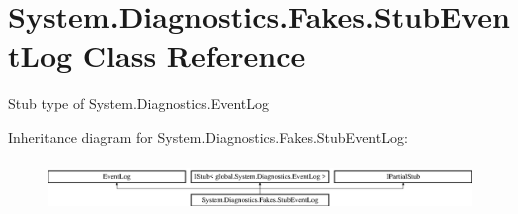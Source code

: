 \hypertarget{class_system_1_1_diagnostics_1_1_fakes_1_1_stub_event_log}{\section{System.\-Diagnostics.\-Fakes.\-Stub\-Event\-Log Class Reference}
\label{class_system_1_1_diagnostics_1_1_fakes_1_1_stub_event_log}
}


Stub type of System.\-Diagnostics.\-Event\-Log 


Inheritance diagram for System.\-Diagnostics.\-Fakes.\-Stub\-Event\-Log\-:\begin{figure}[H]
\begin{center}
\leavevmode
\includegraphics[height=1.352657cm]{class_system_1_1_diagnostics_1_1_fakes_1_1_stub_event_log}
\end{center}
\end{figure}
